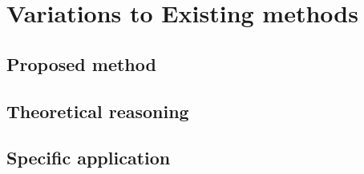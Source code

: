 \chapter{Variations to Existing methods}
\section{Proposed method}
\section{Theoretical reasoning}
\section{Specific application}